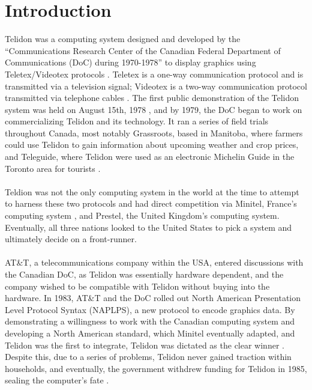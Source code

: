 \documentclass[sigconf]{acmart}
\begin{document}
\section{Introduction}
Telidon was a computing system designed and developed by the “Communications Research Center of the Canadian Federal Department of Communications (DoC) during 1970-1978” to display graphics using Teletex/Videotex protocols \cite{Tenne-Sens82}. Teletex is a one-way communication protocol and is transmitted via a television signal; Videotex is a two-way communication protocol transmitted via telephone cables \cite{boyko_1996}. The first public demonstration of the Telidon system was held on August 15th, 1978 \cite{boyko_1996}, and by 1979, the DoC began to work on commercializing Telidon and its technology. It ran a series of field trials throughout Canada, most notably Grassroots, based in Manitoba, where farmers could use Telidon to gain information about upcoming weather and crop prices, and Teleguide, where Telidon were used as an electronic Michelin Guide in the Toronto area for tourists \cite{miller_1983}. \\ \\

Teldion was not the only computing system in the world at the time to attempt to harness these two protocols and had direct competition via Minitel, France’s computing system \cite{alma_2017}, and Prestel, the United Kingdom’s computing system\cite{hudson_1983}. Eventually, all three nations looked to the United States to pick a system and ultimately decide on a front-runner. \\ \\ 

AT\&T, a telecommunications company within the USA, entered discussions with the Canadian DoC, as Telidon was essentially hardware dependent, and the company wished to be compatible with Telidon without buying into the hardware. In 1983, AT\&T and the DoC rolled out North American Presentation Level Protocol Syntax (NAPLPS), a new protocol to encode graphics data. By demonstrating a willingness to work with the Canadian computing system and developing a North American standard, which Minitel eventually adapted, and Telidon was the first to integrate,  Telidon was dictated as the clear winner \cite{alma_1985}. Despite this, due to a series of problems, Telidon never gained traction within households, and eventually, the government withdrew funding for Telidon in 1985, sealing the computer’s fate \cite{boyko_1996}.
\end{document}
